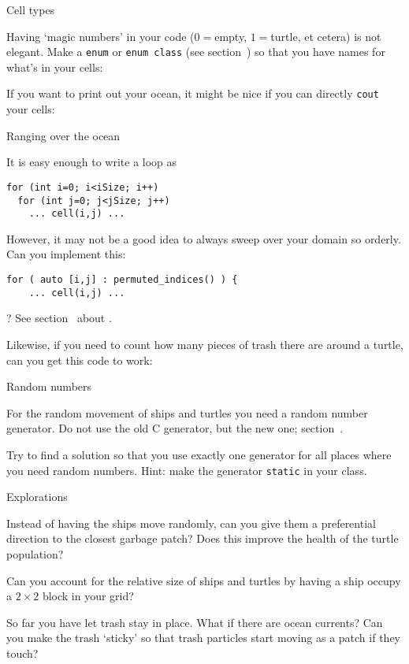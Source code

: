  {Cell types}
\label{sec:turtle-cell}

Having `magic numbers' in your code ($0=$empty, $1=$turtle, et cetera)
is not elegant.
Make a \lstinline{enum} or \lstinline{enum class}
(see section~)
so that you have names
for what's in your cells:

If you want to print out your ocean, it might be nice
if you can directly \lstinline{cout} your cells:


 {Ranging over the ocean}

It is easy enough to write a loop as
\begin{lstlisting}
for (int i=0; i<iSize; i++)
  for (int j=0; j<jSize; j++)
    ... cell(i,j) ...
\end{lstlisting}
However, it may not be a good idea to always sweep
over your domain so orderly. Can you implement this:
\begin{lstlisting}
for ( auto [i,j] : permuted_indices() ) {
    ... cell(i,j) ...
\end{lstlisting}
? See section~ about .


Likewise, if you need to count how many pieces of trash there are
around a turtle, can you get this code to work:

 {Random numbers}

For the random movement of ships and turtles you need
a random number generator.
Do not use the old C generator, but the new
 one;
section~.

Try to find a solution so that you use exactly one generator
for all places where you need random numbers.
Hint: make the generator \lstinline{static} in your class.


 {Explorations}

Instead of having the ships move randomly, can you
give them a preferential direction to the closest
garbage patch?
Does this improve the health of the turtle population?

Can you account for the relative size of ships and turtles
by having a ship occupy a $2\times2$ block in your grid?

So far you have let trash stay in place.
What if there are ocean currents?
Can you make the trash `sticky' so that trash particles
start moving as a patch if they touch?

